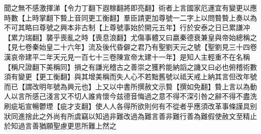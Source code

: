 聞之無不感激揮涕【令力丁翻下遐稼翻將即亮翻】術者上言國家厄運宜有變更以應時數【上時掌翻下䞇上音同更工衡翻】羣臣請更加尊號一二字上以問䞇䞇上奏以為不可其略曰尊號之興本非古制【上尊號事始於開元五年】行於安泰之日已累謙冲【累力瑞翻】襲乎喪亂之時【喪息浪翻】尤傷事體又曰嬴秦德衰兼皇與帝始總稱之【見七卷秦始皇二十六年】流及後代昏僻之君乃有聖劉天元之號【聖劉見三十四卷漢哀帝建平二年天元見一百七十三卷陳宣帝太建十一年】是知人主輕重不在名稱【稱尺證翻下美稱同】損之有謙光稽古之善崇之獲矜能納謟之譏又曰必也俯稽術數須有變更【更工衡翻】與其增美稱而失人心不若黜舊號以祗天戒上納其言但改年號而已【謂改明年號為興元也】上又以中書所撰赦文示䞇【撰如免翻】䞇上言以為動人以言所感己淺言又不切人誰肯懷今兹德音悔過之意不得不深引咎之辭不得不盡洗刷疵垢宣暢鬱堙【疵才支翻】使人人各得所欲則何有不從者乎應須改革事條謹具别狀同進捨此之外尚有所虞竊以知過非難改過為難言善非難行善為難假使赦文至精止於知過言善猶願聖慮更思所難上然之

